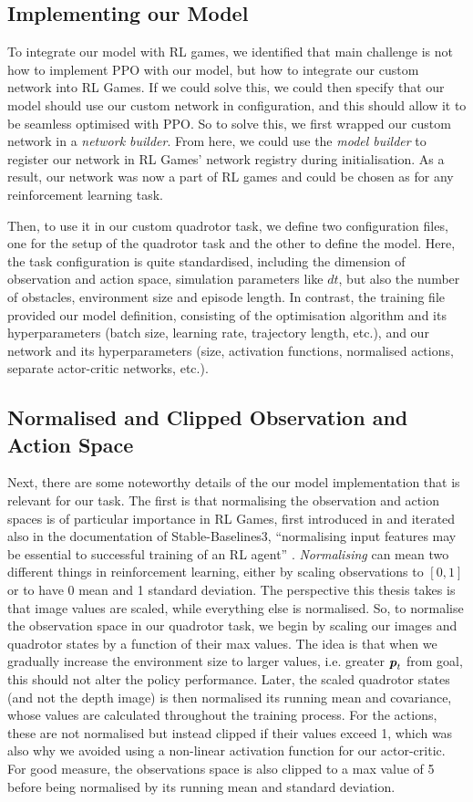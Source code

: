 \subsection{Implementing our Model}
To integrate our model with RL games, we identified that main challenge is not how to implement PPO with our model, but how to integrate our custom network into RL Games. If we could solve this, we could then specify that our model should use our custom network in configuration, and this should allow it to be seamless optimised with PPO.
So to solve this, we first wrapped our custom network in a \textit{network builder}. From here, we could use the \textit{model builder} to register our network in RL Games' network registry during initialisation. As a result, our network was now a part of RL games and could be chosen as for any reinforcement learning task.

Then, to use it in our custom quadrotor task, we define two configuration files, one for the setup of the quadrotor task and the other to define the model. Here, the task configuration is quite standardised, including the dimension of observation and action space, simulation parameters like $dt$, but also the number of obstacles, environment size and episode length. In contrast, the training file provided our model definition, consisting of the optimisation algorithm and its hyperparameters (batch size, learning rate, trajectory length, etc.), and our network and its hyperparameters (size, activation functions, normalised actions, separate actor-critic networks, etc.).

\subsection{Normalised and Clipped Observation and Action Space}
Next, there are some noteworthy details of the our model implementation that is relevant for our task. The first is that normalising the observation and action spaces is of particular importance in RL Games, first introduced in \cite{DDPG} and iterated also in the documentation of Stable-Baselines3, ``normalising input features may be essential to successful training of an RL agent'' \cite{stable-baselines3}. \textit{Normalising} can mean two different things in reinforcement learning, either by scaling observations to $[0, 1]$ or to have 0 mean and 1 standard deviation. The perspective this thesis takes is that image values are scaled, while everything else is normalised.
So, to normalise the observation space in our quadrotor task, we begin by scaling our images and quadrotor states by a function of their max values. The idea is that when we gradually increase the environment size to larger values, i.e. greater ${\boldsymbol{p}}_t$ from goal, this should not alter the policy performance. Later, the scaled quadrotor states (and not the depth image) is then normalised its running mean and covariance, whose values are calculated throughout the training process.
For the actions, these are not normalised but instead clipped if their values exceed 1, which was also why we avoided using a non-linear activation function for our actor-critic. For good measure, the observations space is also clipped to a max value of 5 before being normalised by its running mean and standard deviation.

